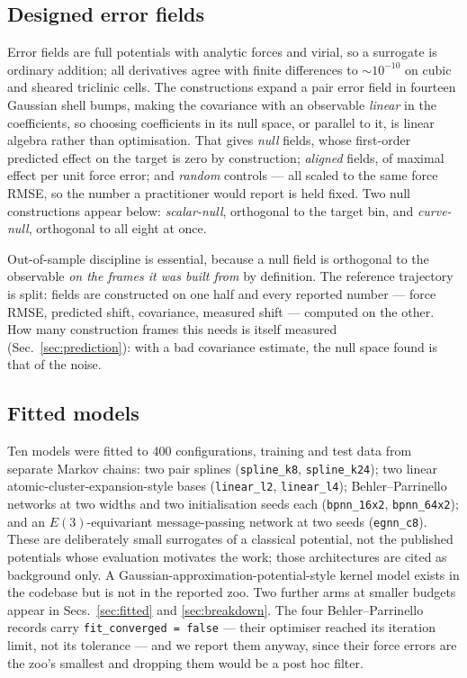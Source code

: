 \documentclass[aip,jcp,reprint,amsmath,amssymb,floatfix]{revtex4-2}
\begin{document}
\subsection{Designed error fields}
\label{sec:designed}

Error fields are full potentials with analytic forces and virial, so a surrogate
is ordinary addition; all derivatives agree with
finite differences to $\sim 10^{-10}$ on cubic and sheared triclinic cells.
The constructions expand a pair error field in fourteen Gaussian
shell bumps, making the covariance with an observable \emph{linear} in the
coefficients, so choosing coefficients in its null space, or
parallel to it, is linear algebra rather than optimisation. That gives
\emph{null} fields, whose first-order predicted effect on
the target is zero by construction; \emph{aligned} fields, of maximal effect
per unit force error; and \emph{random} controls --- all scaled to the same
force RMSE, so the number a practitioner would report
is held fixed. Two null constructions appear below: \emph{scalar-null}, orthogonal to the
target bin, and \emph{curve-null}, orthogonal to all eight at once.

Out-of-sample discipline is essential, because a null field is orthogonal to the
observable \emph{on the frames it was built from} by definition. The reference
trajectory is split: fields are constructed on one half and every
reported number --- force RMSE, predicted shift, covariance, measured shift ---
computed on the other. How many construction frames this needs is itself
measured (Sec.~\ref{sec:prediction}): with a bad covariance estimate,
the null space found is that of the noise.

\subsection{Fitted models}
\label{sec:zoo}

Ten models were fitted to 400 configurations, training and test
data from separate Markov chains: two pair splines
(\texttt{spline\_k8}, \texttt{spline\_k24}); two linear
atomic-cluster-expansion-style bases\cite{Drautz2019, Bartok2013}
(\texttt{linear\_l2}, \texttt{linear\_l4}); Behler--Parrinello
networks\cite{Behler2007, Behler2011} at two widths and two initialisation seeds
each (\texttt{bpnn\_16x2}, \texttt{bpnn\_64x2}); and an $E(3)$-equivariant
message-passing network\cite{Batzner2022, Gilmer2017} at two seeds
(\texttt{egnn\_c8}). These are deliberately small surrogates of a
classical potential, not the published potentials\cite{Bartok2010,
Batatia2022, Schutt2018, Thompson2015} whose evaluation motivates the work;
those architectures are cited as background only. A
Gaussian-approximation-potential-style kernel
model\cite{Bartok2010} exists in the codebase but is not in the reported zoo.
Two further arms at smaller budgets appear in
Secs.~\ref{sec:fitted} and \ref{sec:breakdown}. The four
Behler--Parrinello records carry \texttt{fit\_converged = false} --- their
optimiser reached its iteration limit, not its tolerance --- and we
report them anyway, since their force errors are the zoo's smallest and
dropping them would be a post hoc filter.
\end{document}
